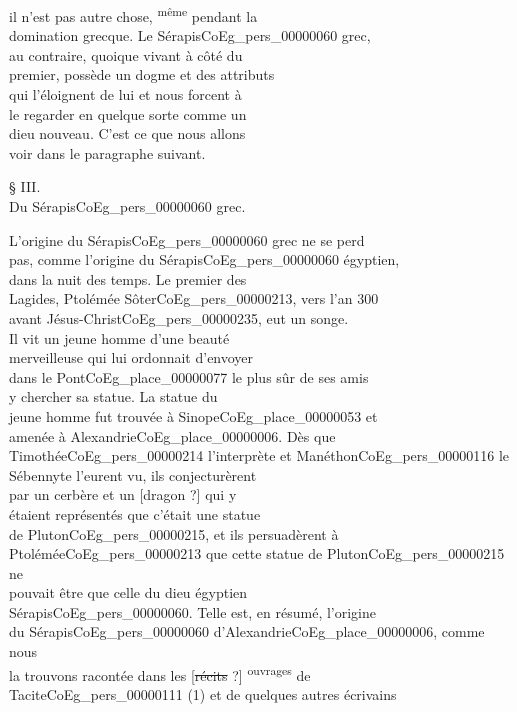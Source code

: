 \documentclass{book}
\begin{document}
{\begin{paracol}{2}
il n’est pas autre chose, \textsuperscript{même} pendant la\\
domination grecque. Le Sérapis\gls{CoEg_pers_00000060} grec,\\
au contraire, quoique vivant à côté du\\
premier, possède un dogme et des attributs\\
qui l’éloignent de lui et nous forcent à\\
le regarder en quelque sorte comme un\\
dieu nouveau. C’est ce que nous allons\\
voir dans le paragraphe suivant.
\begin{center}
§ III.\\
Du Sérapis\gls{CoEg_pers_00000060} grec.\end{center}
L’origine du Sérapis\gls{CoEg_pers_00000060} grec ne se perd\\
pas, comme l’origine du Sérapis\gls{CoEg_pers_00000060} égyptien,\\
dans la nuit des temps. Le premier des\\
Lagides, Ptolémée Sôter\gls{CoEg_pers_00000213}, vers l’an 300\\
avant Jésus-Christ\gls{CoEg_pers_00000235}, eut un songe.\\
Il vit un jeune homme d’une beauté\\
merveilleuse qui lui ordonnait d’envoyer\\
dans le Pont\gls{CoEg_place_00000077} le plus sûr de ses amis\\
y chercher sa statue. La statue du\\
jeune homme fut trouvée à Sinope\gls{CoEg_place_00000053} et\\
amenée à Alexandrie\gls{CoEg_place_00000006}. Dès que\\
Timothée\gls{CoEg_pers_00000214} l’interprète et Manéthon\gls{CoEg_pers_00000116} le\\
Sébennyte l’eurent vu, ils conjecturèrent\\
par un cerbère et un [dragon ?] qui y\\
étaient représentés que c’était une statue\\
de Pluton\gls{CoEg_pers_00000215}, et ils persuadèrent à\\
Ptolémée\gls{CoEg_pers_00000213} que cette statue de Pluton\gls{CoEg_pers_00000215} ne\\
pouvait être que celle du dieu égyptien\\
Sérapis\gls{CoEg_pers_00000060}. Telle est, en résumé, l’origine\\
du Sérapis\gls{CoEg_pers_00000060} d’Alexandrie\gls{CoEg_place_00000006}, comme nous\\
la trouvons racontée dans les [\sout{récits} ?] \textsuperscript{ouvrages} de\\
Tacite\gls{CoEg_pers_00000111} (1) et de quelques autres écrivains\\
\end{paracol}

}
\end{document}
